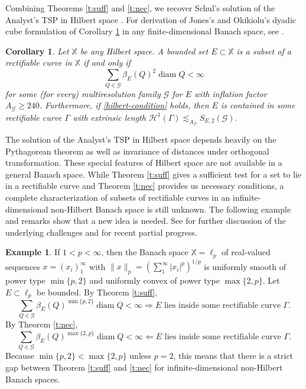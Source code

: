 \documentclass[12pt]{amsart}
\numberwithin{equation}{section}
\theoremstyle{plain}
\newtheorem{corollary}[theorem]{Corollary}
\theoremstyle{definition}
\newtheorem{example}[theorem]{Example}
\def\XX{{\mathbb{X}}}
\newcommand{\diam}{\mathop\mathrm{diam}\nolimits}
\newcommand{\Haus}{\mathcal{H}}
\numberwithin{figure}{section}
\begin{document}
Combining Theorems \ref{t:suff} and \ref{t:nec}, we recover Schul's solution of the Analyst's TSP in Hilbert space \cite{Schul-Hilbert}. For derivation of Jones's and Okikiolu's dyadic cube formulation of Corollary \ref{c:hilbert} in any finite-dimensional Banach space, see \cite[\S4]{Badger-McCurdy-1}.

\begin{corollary} \label{c:hilbert} Let $\XX$ be any Hilbert space. A bounded set $E\subset\XX$ is a subset of a rectifiable curve in $\XX$ if and only if \begin{equation}\label{hilbert-condition}\sum_{Q\in \mathscr{G}}\beta_E(Q)^2\diam Q<\infty\end{equation} for some (for every) multiresolution family $\mathscr{G}$ for $E$ with inflation factor $A_\mathscr{G}\geq 240$. Furthermore, if \eqref{hilbert-condition} holds, then $E$ is contained in some rectifiable curve $\Gamma$ with extrinsic length $\Haus^1(\Gamma)\lesssim_{A_\mathscr{G}} S_{E,2}(\mathscr{G})$.
\end{corollary}

The solution of the Analyst's TSP in Hilbert space depends heavily on the Pythagorean theorem as well as invariance of distances under orthogonal transformation. These special features of Hilbert space are not available in a general Banach space. While Theorem \ref{t:suff} gives a sufficient test for a set to lie in a rectifiable curve and Theorem \ref{t:nec} provides us  necessary conditions, a complete characterization of subsets of rectifiable curves in an infinite-dimensional non-Hilbert Banach space is still unknown. The following example and remarks show that a new idea is needed. See \cite{Schul-survey} for further discussion of the underlying challenges and \cite{DS-metric} for recent partial progress.

\begin{example} If $1<p<\infty$, then the Banach space $\XX=\ell_p$ of real-valued sequences $x=(x_i)_1^\infty$ with $\|x\|_p=\left(\sum_1^\infty |x_i|^p\right)^{1/p}$ is uniformly smooth of power type $\min\{p,2\}$ and uniformly convex of power type $\max\{2,p\}$. Let $E\subset \ell_p$ be bounded. By Theorem \ref{t:suff}, \begin{equation}\label{p-suff}\sum_{Q\in\mathscr{G}} \beta_E(Q)^{\min\{p,2\}}\diam Q<\infty\Longrightarrow \text{$E$ lies inside some rectifiable curve $\Gamma$}.\end{equation} By Theorem \ref{t:nec}, \begin{equation}\label{p-nec} \sum_{Q\in\mathscr{G}} \beta_E(Q)^{\max\{2,p\}}\diam Q<\infty\Longleftarrow \text{$E$ lies inside some rectifiable curve $\Gamma$.}\end{equation} Because $\min\{p,2\}<\max\{2,p\}$ unless $p=2$, this means that there is a strict gap between Theorem \ref{t:suff} and \ref{t:nec} for infinite-dimensional non-Hilbert Banach spaces.\end{example}
\end{document}
